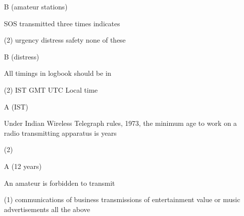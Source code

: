 \documentclass[a4paper]{article}
\begin{document}
\begin{solution}
	B (amateur stations)
\end{solution}

\vspace{5mm}



\begin{question}SOS transmitted three times indicates
	\begin{tasks}(2)
		\task urgency
		\task distress
		\task safety
		\task none of these
	\end{tasks}
\end{question}

\begin{solution}
	B (distress)
\end{solution}

\vspace{5mm}



\begin{question}All timings in logbook should be in
	\begin{tasks}(2)
		\task IST
		\task GMT
		\task UTC
		\task Local time
	\end{tasks}
\end{question}

\begin{solution}
	A (IST)
\end{solution}

\vspace{5mm}



\begin{question}Under Indian Wireless Telegraph rules, 1973, the minimum age to work on a radio transmitting apparatus is \spaces years
	\begin{tasks}(2)
	\end{tasks}
\end{question}

\begin{solution}
	A (12 years)
\end{solution}

\vspace{5mm}



\begin{question}An amateur is forbidden to transmit
	\begin{tasks}(1)
		\task communications of business
		\task transmissions of entertainment value or music
		\task advertisements
		\task all the above
	\end{tasks}
\end{question}
\end{document}
